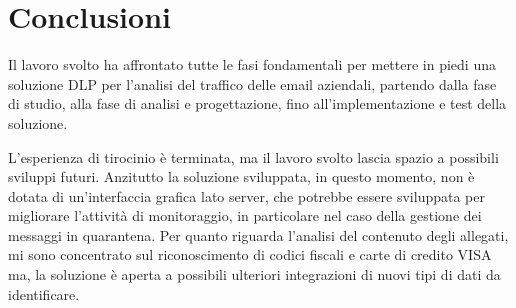 \chapter{Conclusioni}

Il lavoro svolto ha affrontato tutte le fasi fondamentali per mettere in piedi una 
soluzione DLP per l'analisi del traffico delle email aziendali, partendo dalla fase di 
studio, alla fase di analisi e progettazione, fino all'implementazione e test della soluzione.

L'esperienza di tirocinio è terminata, ma il lavoro svolto lascia spazio a possibili sviluppi futuri.
Anzitutto la soluzione sviluppata, in questo momento, non è dotata di un'interfaccia grafica lato server,
che potrebbe essere sviluppata per migliorare l'attività di monitoraggio, in particolare nel caso della 
gestione dei messaggi in quarantena.
Per quanto riguarda l'analisi del contenuto degli allegati, mi sono concentrato sul riconoscimento di 
codici fiscali e carte di credito VISA ma, la soluzione è aperta a possibili ulteriori integrazioni di nuovi
tipi di dati da identificare. 
